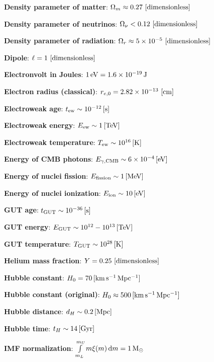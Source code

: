 \documentclass[a4paper,11pt]{article}
\begin{document}
{\noindent}\textbf{Density parameter of matter}: $\Omega_m \approx 0.27 ~ [{\rm dimensionless}]$

{\noindent}\textbf{Density parameter of neutrinos}: $\Omega_\nu < 0.12 ~ [{\rm dimensionless}]$

{\noindent}\textbf{Density parameter of radiation}: $\Omega_r \approx 5\times10^{-5} ~ [{\rm dimensionless}]$

{\noindent}\textbf{Dipole}: $\ell=1 ~ [{\rm dimensionless}]$

{\noindent}\textbf{Electronvolt in Joules}: $1\,{\rm eV} = 1.6\times10^{-19}\,{\rm J}$

{\noindent}\textbf{Electron radius (classical)}: $r_{e,0}=2.82\times10^{-13} ~ [{\rm cm}]$

{\noindent}\textbf{Electroweak age}: $t_\mathrm{ew} \sim 10^{-12}\,[{\rm s}]$

{\noindent}\textbf{Electroweak energy}: $E_\mathrm{ew} \sim 1\,[{\rm TeV}]$

{\noindent}\textbf{Electroweak temperature}: $T_\mathrm{ew} \sim 10^{16}\,[{\rm K}]$

{\noindent}\textbf{Energy of CMB photons}: $E_{\gamma,\mathrm{CMB}} \sim 6\times10^{-4}\,[{\rm eV}]$

{\noindent}\textbf{Energy of nuclei fission}: $E_\mathrm{fission} \sim 1\,[{\rm MeV}]$

{\noindent}\textbf{Energy of nuclei ionization}: $E_\mathrm{ion} \sim 10\,[{\rm eV}]$

{\noindent}\textbf{GUT age}: $t_\mathrm{GUT} \sim 10^{-36}\,[{\rm s}]$

{\noindent}\textbf{GUT energy}: $E_\mathrm{GUT} \sim 10^{12}-10^{13}\,[{\rm TeV}]$

{\noindent}\textbf{GUT temperature}: $T_\mathrm{GUT} \sim 10^{28}\,[{\rm K}]$

{\noindent}\textbf{Helium mass fraction}: $Y = 0.25 ~ [{\rm dimensionless}]$

{\noindent}\textbf{Hubble constant}: $H_0 = 70\,[{\rm km\,s^{-1}\,Mpc^{-1}}]$

{\noindent}\textbf{Hubble constant (original)}: $H_0 \approx 500\,[{\rm km\,s^{-1}\,Mpc^{-1}}]$

{\noindent}\textbf{Hubble distance}: $d_H \sim 0.2\,[{\rm Mpc}]$

{\noindent}\textbf{Hubble time}: $t_H \sim 14\,[{\rm Gyr}]$

{\noindent}\textbf{IMF normalization}: $\int\limits_{m_L}^{m_U} m\xi(m)\,\mathrm{d}m = 1\,{\rm M}_\odot$
\end{document}
